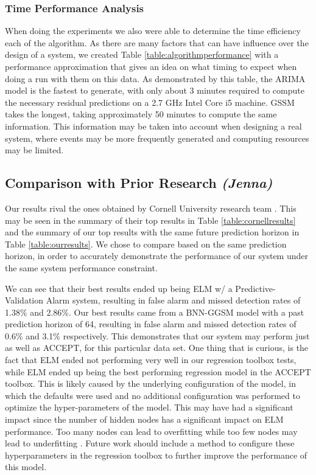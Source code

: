 \documentclass{acm_proc_article-sp}
\begin{document}
\subsubsection{Time Performance Analysis}
When doing the experiments we also were able to determine the time efficiency each of the algorithm. As there are many factors that can have influence over the design of a system, we created Table \ref{table:algorithmperformance} with a performance approximation that gives an idea on what timing to expect when doing a run with them on this data. As demonstrated by this table, the ARIMA model is the fastest to generate, with only about 3 minutes required to compute the necessary residual predictions on a 2.7 GHz Intel Core i5 machine. GSSM takes the longest, taking approximately 50 minutes to compute the same information. This information may be taken into account when designing a real system, where events may be more frequently generated and computing resources may be limited.


\subsection{Comparison with Prior Research  \textit{(Jenna)}}

Our results rival the ones obtained by Cornell University research team \cite{Cornell}. This may be seen in the summary of their top results in Table \ref{table:cornellresults} and the summary of our top results with the same future prediction horizon in Table \ref{table:ourresults}. We chose to compare based on the same prediction horizon, in order to accurately demonstrate the performance of our system under the same system performance constraint.

We can see that their best results ended up being ELM w/ a Predictive-Validation Alarm system, resulting in false alarm and missed detection rates of 1.38\% and 2.86\%. Our best results came from a BNN-GGSM model with a past prediction horizon of 64, resulting in false alarm and missed detection rates of 0.6\% and 3.1\% respectively. This demonstrates that our system may perform just as well as ACCEPT, for this particular data set. One thing that is curious, is the fact that ELM ended not performing very well in our regression toolbox tests, while ELM ended up being the best performing regression model in the ACCEPT toolbox. This is likely caused by the underlying configuration of the model, in which the defaults were used and no additional configuration was performed to optimize the hyper-parameters of the model. This may have had a significant impact since the number of hidden nodes has a significant impact on ELM performance. Too many nodes can lead to overfitting while too few nodes may lead to underfitting \cite{ELM}. Future work should include a method to configure these hyperparameters in the regression toolbox to further improve the performance of this model.
\end{document}
